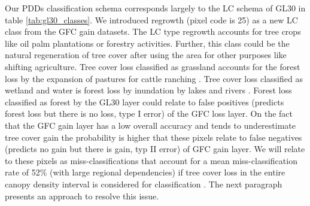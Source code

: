 			Our \acp{PDD} classification schema corresponds largely to the \ac{LC} schema of \ac{GL30} in table \ref{tab:gl30_classes}. We introduced regrowth (pixel code is 25) as a new \ac{LC} class from the \ac{GFC} gain datasets. The \ac{LC} type regrowth accounts for tree crops like oil palm plantations or forestry activities. Further, this class could be the natural regeneration of tree cover after using the area for other purposes like shifting agriculture. Tree cover loss classified as grassland accounts for the forest loss by the expansion of pastures for cattle ranching \citep{Graesser2015}. Tree cover loss classified as wetland and water is forest loss by inundation by lakes and rivers \citep{Sy2015}. Forest loss classified as forest by the \ac{GL30} layer could relate to false positives (predicts forest loss but there is no loss, type I error) of the \ac{GFC} loss layer. On the fact that the \ac{GFC} gain layer has a low overall accuracy and tends to underestimate tree cover gain the probability is higher that these pixels relate to false negatives (predicts no gain but there is gain, typ II error) of \ac{GFC} gain layer. We will relate to these pixels as miss-classifications that account for a mean miss-classification rate of 52\% (with large regional dependencies) if tree cover loss in the entire canopy density interval is considered for classification \citep{Seydewitz2017}. The next paragraph presents an approach to resolve this issue. 

